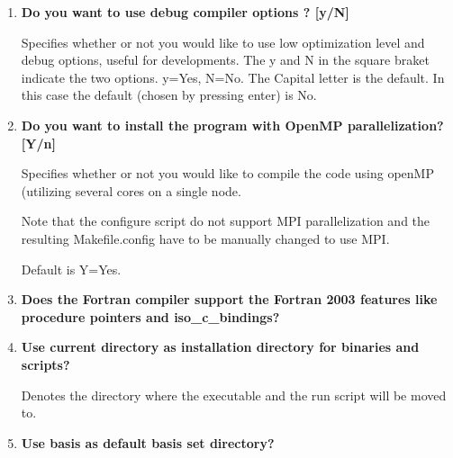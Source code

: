 \begin{enumerate}

\item {\bf Do you want to use debug compiler options ? [y/N]}

Specifies whether or not you would like to use low optimization level and debug options, useful for developments. The y and N in the square braket indicate the two options. y=Yes, N=No. The Capital letter is the default. In this case the default (chosen by pressing enter) is No.

\item {\bf Do you want to install the program with OpenMP parallelization? [Y/n]}

Specifies whether or not you would like to compile the code using openMP (utilizing
several cores on a single node.

Note that the configure script do not support MPI parallelization and the resulting Makefile.config have to be manually changed to use MPI.

Default is Y=Yes.

 
%
%
%

\item {\bf Does the Fortran compiler support the Fortran 2003 features like procedure pointers and iso\_c\_bindings?}

\item {\bf Use current directory as installation directory for binaries and scripts?}

Denotes the directory where the executable and the run script will be moved to.

\item {\bf Use basis as default basis set directory?}


\end{enumerate}
